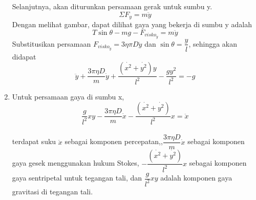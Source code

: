 \documentclass[12pt]{article}
\begin{document}
\begin{enumerate}[label=(\alph*)]
		Selanjutnya, akan diturunkan persamaan gerak untuk sumbu y. 
		\begin{equation}
		\Sigma F_y = m \ddot{y}
		\end{equation}
		Dengan melihat gambar, dapat dilihat gaya yang bekerja di sumbu y adalah
		\begin{equation}
		T \sin\theta -mg - F_{visko_y} =m\ddot{y}
		\end{equation}
		Substitusikan persamaan $	F_{visko_y}= 3\eta\pi D\ddot{y}	$ dan $\sin \theta =\dfrac{y}{l} $, sehingga akan didapat
		\begin{equation}
		\ddot{y} + \dfrac{3\pi\eta D}{m} \dot{y} + \dfrac {({\dot{x^2}+\dot{y^2}})y}{l^2} -\dfrac{gy^2}{l^2} = -g
		\end{equation}
		\item Untuk persamaan gaya di sumbu x, 
		\begin{equation}
		\dfrac{g}{l^2}xy - \dfrac{3\pi\eta D}{m} \dot{x} - \dfrac{(\dot{x^2}+\dot{y^2})}{l^2}x =\ddot{x}
		\end{equation} \\
		terdapat suku $\ddot{x}$ sebagai komponen percepatan,,$ \dfrac{3\pi\eta D}{m} \dot{x} $ sebagai komponen gaya gesek menggunakan hukum Stokes, $-\dfrac{(\dot{x^2}+\dot{y^2})}{l^2}x$ sebagai komponen gaya sentripetal untuk tegangan tali, dan $\dfrac{g}{l^2}xy$ adalah komponen gaya gravitasi di tegangan tali.
		

\end{enumerate}
\end{document}
